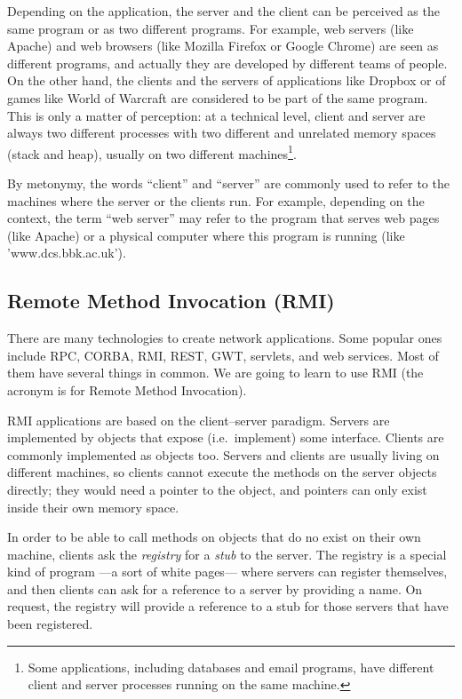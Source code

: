 Depending on the application, the server and the client can be
perceived as the same program or as two different programs. 
For example, web servers (like
Apache) and web browsers (like Mozilla Firefox or Google Chrome) are
seen as different programs, and actually they are developed by
different teams of people. On the other hand, the clients and the
servers of applications like Dropbox or of games 
like World of Warcraft are considered to be part of
the same program. This is only a matter of perception: at a technical
level, client and server are always two different processes with two
different and unrelated memory spaces (stack and heap), usually on two
different machines\footnote{Some applications, including databases and
email programs, have different client and server processes running on
the same machine.}. 

By metonymy, the words ``client'' and ``server'' 
are commonly used to refer to
the machines where the server or the clients run. For example,
depending on the context, the term ``web server'' may refer to the
program that serves web pages (like Apache) or a physical computer
where this program is running (like 'www.dcs.bbk.ac.uk'). 

\subsection{Remote Method Invocation (RMI)}
\label{sec:remote-meth-invoc}

There are many technologies to create network applications. Some 
popular ones include RPC, CORBA, RMI, REST, GWT, servlets, and web
services. Most of them have several things in common. We are going to
learn to use RMI (the acronym is for Remote Method Invocation). 

RMI applications are based on the client--server paradigm. Servers are
implemented by objects that expose (i.e.~implement) some
interface. Clients are commonly implemented as objects too. Servers
and clients are usually living on different machines, so clients
cannot execute the methods on the server objects directly; they would
need a pointer to the object, and pointers can only exist inside their
own memory space. 

In order to be able to call methods on objects that do no exist on
their own machine, clients ask the \emph{registry} for a \emph{stub} to the
server. The registry is a special kind of program ---a sort of white
pages--- where servers can register themselves, and then clients can
ask for a reference to a server by providing a name. 
On request, the registry will
provide a reference to a stub for those servers that have been registered. 

